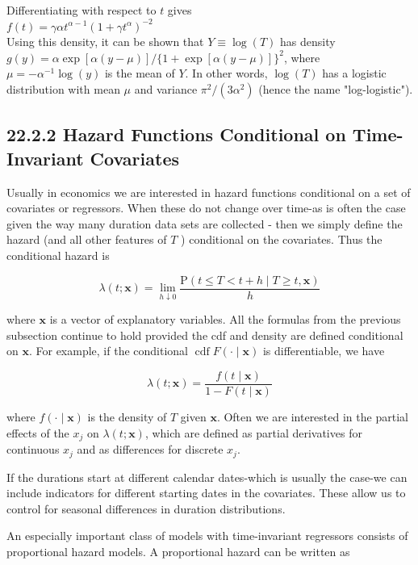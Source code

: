 \documentclass[10pt]{article}
\begin{document}
Differentiating with respect to $t$ gives\\
$f(t)=\gamma \alpha t^{\alpha-1}\left(1+\gamma t^{\alpha}\right)^{-2}$\\
Using this density, it can be shown that $Y \equiv \log (T)$ has density $g(y)= \alpha \exp [\alpha(y-\mu)] /\{1+\exp [\alpha(y-\mu)]\}^{2}$, where $\mu=-\alpha^{-1} \log (y)$ is the mean of $Y$. In other words, $\log (T)$ has a logistic distribution with mean $\mu$ and variance $\pi^{2} /\left(3 \alpha^{2}\right)$ (hence the name "log-logistic").

\subsection*{22.2.2 Hazard Functions Conditional on Time-Invariant Covariates}
Usually in economics we are interested in hazard functions conditional on a set of covariates or regressors. When these do not change over time-as is often the case given the way many duration data sets are collected - then we simply define the hazard (and all other features of $T$ ) conditional on the covariates. Thus the conditional hazard is

$$
\lambda(t ; \mathbf{x})=\lim _{h \downarrow 0} \frac{\mathrm{P}(t \leq T<t+h \mid T \geq t, \mathbf{x})}{h}
$$

where $\mathbf{x}$ is a vector of explanatory variables. All the formulas from the previous subsection continue to hold provided the cdf and density are defined conditional on $\mathbf{x}$. For example, if the conditional $\operatorname{cdf} F(\cdot \mid \mathbf{x})$ is differentiable, we have


\begin{equation*}
\lambda(t ; \mathbf{x})=\frac{f(t \mid \mathbf{x})}{1-F(t \mid \mathbf{x})} \tag{22.15}
\end{equation*}


where $f(\cdot \mid \mathbf{x})$ is the density of $T$ given $\mathbf{x}$. Often we are interested in the partial effects of the $x_{j}$ on $\lambda(t ; \mathbf{x})$, which are defined as partial derivatives for continuous $x_{j}$ and as differences for discrete $x_{j}$.

If the durations start at different calendar dates-which is usually the case-we can include indicators for different starting dates in the covariates. These allow us to control for seasonal differences in duration distributions.

An especially important class of models with time-invariant regressors consists of proportional hazard models. A proportional hazard can be written as
\end{document}

